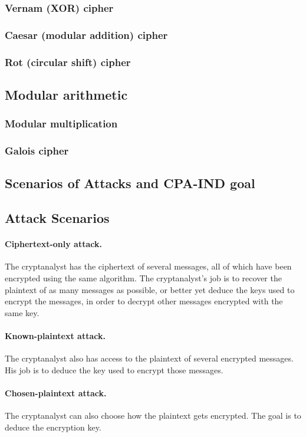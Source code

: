 \documentclass{article}
\theoremstyle{mytheoremstyle}
\begin{document}
    \subsubsection{Vernam (XOR) cipher}
    
    \subsubsection{Caesar (modular addition) cipher}

    \subsubsection{Rot (circular shift) cipher}
    \subsection{Modular arithmetic}
    \subsubsection{Modular multiplication}
    \subsubsection{Galois cipher}
    \subsection{Scenarios of Attacks and CPA-IND goal}
    \subsection{Attack Scenarios}
    \paragraph{Ciphertext-only attack.}
    The cryptanalyst has the ciphertext of several messages, all of which have been encrypted using the same algorithm. The cryptanalyst's job is to recover the plaintext of as many messages as possible, or better yet deduce the keys used to encrypt the messages, in order to decrypt other messages encrypted with the same key.
    \paragraph{Known-plaintext attack.}
    The cryptanalyst also has access to the plaintext of several encrypted messages. His job is to deduce the key used to encrypt those messages.
    \paragraph{Chosen-plaintext attack.}
    The cryptanalyst can also choose how the plaintext gets encrypted. The goal is to deduce the encryption key.
\end{document}
